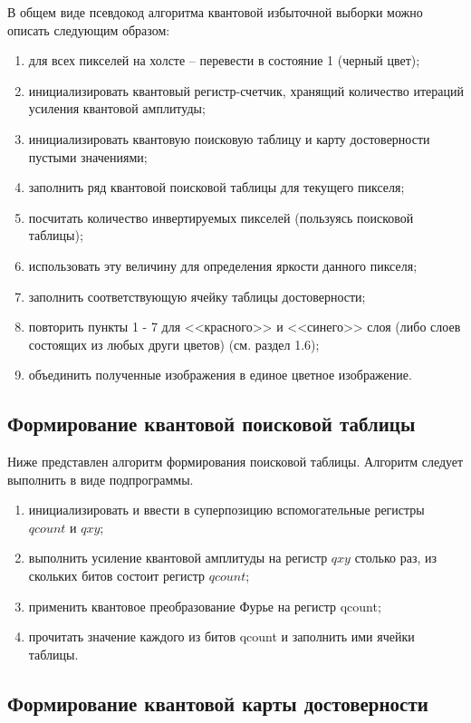 В общем виде псевдокод алгоритма квантовой избыточной выборки можно описать следующим образом:

\begin{enumerate}
	\item для всех пикселей на холсте -- перевести в состояние 1 (черный цвет);
	\item инициализировать квантовый регистр-счетчик, хранящий количество итераций усиления квантовой амплитуды;
	\item инициализировать квантовую поисковую таблицу и карту достоверности пустыми значениями;
	\item заполнить ряд квантовой поисковой таблицы для текущего пикселя;
	\item посчитать количество инвертируемых пикселей (пользуясь поисковой таблицы);
	\item использовать эту величину для определения яркости данного пикселя;
	\item заполнить соответствующую ячейку таблицы достоверности;
	\item повторить пункты 1 - 7 для <<красного>> и <<синего>> слоя (либо слоев состоящих из любых други цветов) (см. раздел 1.6);
	\item объединить полученные изображения в единое цветное изображение.
\end{enumerate}

\subsection{Формирование квантовой поисковой таблицы}

Ниже представлен алгоритм формирования поисковой таблицы. Алгоритм следует выполнить в виде подпрограммы.

\begin{enumerate}
	\item инициализировать и ввести в суперпозицию вспомогательные регистры $qcount$ и $qxy$;
	\item выполнить усиление квантовой амплитуды на регистр $qxy$ столько раз, из скольких битов состоит регистр $qcount$;
	\item применить квантовое преобразование Фурье на регистр qcount;
	\item прочитать значение каждого из битов qcount и заполнить ими ячейки таблицы.
\end{enumerate}

\subsection{Формирование квантовой карты достоверности}

